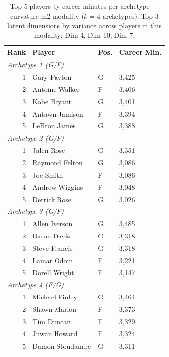 \begin{table}[htbp]
  \centering\small
  \begin{tabular}{rlll}
    \toprule
    Rank & Player & Pos. & Career Min. \\
    \midrule
    \multicolumn{4}{l}{\textit{Archetype 1 (G/F)}} \\
    \midrule
    1 & Gary Payton & G & 3,425 \\
    2 & Antoine Walker & F & 3,406 \\
    3 & Kobe Bryant & G & 3,401 \\
    4 & Antawn Jamison & F & 3,394 \\
    5 & LeBron James & G & 3,388 \\
    \midrule[0.4pt]
    \multicolumn{4}{l}{\textit{Archetype 2 (G/F)}} \\
    \midrule
    1 & Jalen Rose & G & 3,351 \\
    2 & Raymond Felton & G & 3,086 \\
    3 & Joe Smith & F & 3,086 \\
    4 & Andrew Wiggins & F & 3,048 \\
    5 & Derrick Rose & G & 3,026 \\
    \midrule[0.4pt]
    \multicolumn{4}{l}{\textit{Archetype 3 (G/F)}} \\
    \midrule
    1 & Allen Iverson & G & 3,485 \\
    2 & Baron Davis & G & 3,318 \\
    3 & Steve Francis & G & 3,318 \\
    4 & Lamar Odom & F & 3,221 \\
    5 & Dorell Wright & F & 3,147 \\
    \midrule[0.4pt]
    \multicolumn{4}{l}{\textit{Archetype 4 (F/G)}} \\
    \midrule
    1 & Michael Finley & G & 3,464 \\
    2 & Shawn Marion & F & 3,373 \\
    3 & Tim Duncan & F & 3,329 \\
    4 & Juwan Howard & F & 3,324 \\
    5 & Damon Stoudamire & G & 3,311 \\
    \bottomrule
  \end{tabular}
  \caption{Top 5 players by career minutes per archetype --- curvature-m2 modality ($k=4$ archetypes). Top-3 latent dimensions by variance across players in this modality: Dim 4, Dim 10, Dim 7.}
  \label{tab:arch_reps_curvature_m2}
\end{table}

